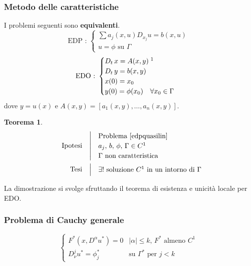 \documentclass[serif,notheorems]{beamer}
\makeatletter
\newenvironment{ipotesi}%
{\quad\left|\quad\def\arraystretch{1.2}\begin{array}{@{}l@{}}}%
{\end{array}\right.}
\newcommand{\hpth}[2]
{
\begin{align*}
\quad
\text{Ipotesi}
&\begin{ipotesi}
#1
\end{ipotesi}\\
\text{Tesi}
&\begin{ipotesi}
#2
\end{ipotesi}
\end{align*}
}
\theoremstyle{definition} %
\newtheorem{theorem}{Teorema}[section] %
\theoremstyle{remark}
\makeatother
\begin{document}
\begin{frame}
\frametitle{Metodo delle caratteristiche}
I problemi seguenti sono \textbf{equivalenti}.
\begin{equation} \label{edpquasilin}
\text{EDP : }
\begin{cases}
\sum a_j(x,u)D_{x_j} u = b(x,u)\\
u = \phi \text{ su } \Gamma
\end{cases} 
\end{equation}
\begin{equation}
\text{EDO : }
\begin{cases}
D_t \, x = A(x,y) \; \footnotemark \\
D_t \, y = b(x,y)\\ 
x(0)=x_0\\ 
y(0) = \phi (x_0) \quad \forall x_0 \in \Gamma
\end{cases} 
\end{equation}
dove $y = u(x)$ e $A(x,y)=[a_1(x,y),\ldots ,a_n(x,y)]$.
\end{frame}

\begin{frame}
\begin{theorem}
\hpth{
\text{Problema \eqref{edpquasilin} } \\
a_j, \, b, \, \phi , \, \Gamma \in C^1\\
\Gamma \text{ non caratteristica}
}{
\exists ! \text{ soluzione } C^1 \text{ in un intorno di } \Gamma
}
\end{theorem}
{
La dimostrazione si svolge sfruttando il teorema di esistenza e unicità locale per EDO.
}
\end{frame}

\begin{frame}
\frametitle{Problema di Cauchy generale}
\begin{equation*}
\begin{cases}
F^*(x,D^\alpha u^*)=0 & |\alpha | \leq k, \, F^* \text{ almeno } C^1\\
D^j_\nu u^* = \phi_j^* & \text{su } \Gamma^* \text{ per }j<k 
\end{cases}
\end{equation*}
\end{frame}
\end{document}

